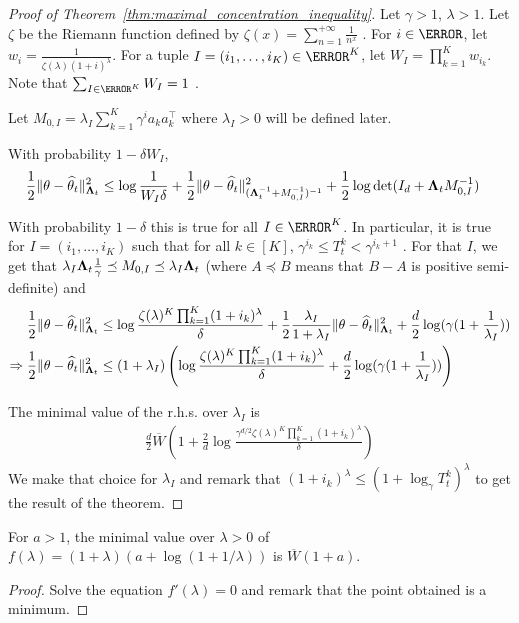 \begin{proof}[Proof of Theorem~\ref{thm:maximal_concentration_inequality}]
Let $\gamma > 1$, $\lambda > 1$. Let $\zeta$ be the Riemann function defined by $\zeta(x) = \sum_{n=1}^{+\infty}\frac{1}{n^x}$ . For $i\in \N$, let $w_i = \frac{1}{\zeta(\lambda)(1+i)^\lambda}$. For a tuple $I=(i_1,\ldots,i_K)\in \N^K$, let $W_I = \prod_{k=1}^K w_{i_k}$. Note that $\sum_{I \in \N^K} W_I = 1$ .

Let $M_{0,I} = \lambda_I \sum_{k=1}^K \gamma^i a_k a_k^\top$ where $\lambda_I > 0$ will be defined later.

With probability $1- \delta W_I$,
\begin{align*}
\frac{1}{2} \Vert \theta - \widehat{\theta}_t \Vert^2_{{\boldsymbol \Lambda}_t}
&\le \log\frac{1}{W_I \delta} + \frac{1}{2} \Vert \theta - \widehat{\theta}_t \Vert_{({\boldsymbol \Lambda}_t^{-1} + M_{0,I}^{-1})^{-1}}^2 + \frac{1}{2} \log \det (I_d + {\boldsymbol \Lambda}_t M_{0,I}^{-1})
\end{align*}

With probability $1- \delta$ this is true for all $I \in \N^K$. In particular, it is true for $I=(i_1,\ldots,i_K)$ such that for all $k \in [K]$, $\gamma^{i_k} \le T_t^k < \gamma^{i_k+1}$ . For that $I$, we get that $\lambda_I {\boldsymbol \Lambda}_t \frac{1}{\gamma} \preceq M_{0,I} \preceq \lambda_I {\boldsymbol \Lambda}_t$ (where $A\preceq B$ means that $B-A$ is positive semi-definite) and
\begin{align*}
\frac{1}{2} \Vert \theta - \widehat{\theta}_t \Vert^2_{{\boldsymbol \Lambda}_t}
&\le \log\frac{\zeta(\lambda)^K\prod_{k=1}^K(1+i_k)^\lambda}{\delta} + \frac{1}{2} \frac{\lambda_I}{1+\lambda_I} \Vert \theta - \widehat{\theta}_t \Vert_{{\boldsymbol \Lambda}_t}^2 + \frac{d}{2} \log (\gamma(1 + \frac{1}{\lambda_I}))
\\
\Rightarrow
\frac{1}{2} \Vert \theta - \widehat{\theta}_t \Vert^2_{{\boldsymbol \Lambda}_t}
&\le (1 + \lambda_I)\left(\log\frac{\zeta(\lambda)^K\prod_{k=1}^K(1+i_k)^\lambda}{\delta} + \frac{d}{2} \log (\gamma(1 + \frac{1}{\lambda_I})) \right)
\end{align*}

The minimal value of the r.h.s. over $\lambda_I$ is
\begin{align*}
\frac{d}{2} \overline{W}\left( 1 + \frac{2}{d}\log \frac{\gamma^{d/2}\zeta(\lambda)^K\prod_{k=1}^K(1+i_k)^\lambda}{\delta} \right)
\end{align*}
We make that choice for $\lambda_I$ and remark that $(1+i_k)^\lambda \le (1+\log_\gamma T_t^k)^\lambda$ to get the result of the theorem.


\end{proof}

\begin{lemma}
For $a>1$, the minimal value over $\lambda>0$ of $f(\lambda) = (1+\lambda)(a+\log(1+1/\lambda))$ is $\overline{W}(1+a)$.
\end{lemma}
\begin{proof}
Solve the equation $f'(\lambda)=0$ and remark that the point obtained is a minimum.
\end{proof}

\fi
